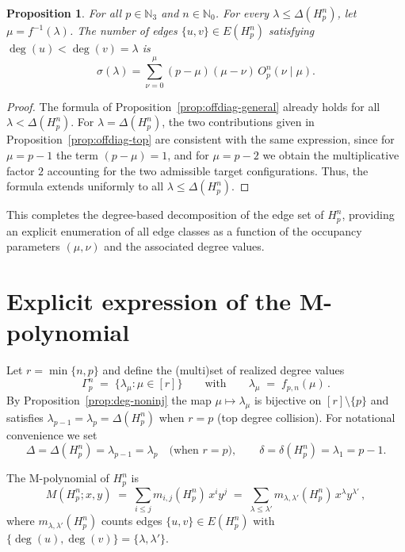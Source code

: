 \documentclass[letterpaper,12pt]{article}
\newtheorem{proposition}{Proposition}
\begin{document}
\begin{proposition}\label{prop:offdiag-lambda}
For all $p \in \mathbb{N}_3$ and $n \in \mathbb{N}_0$. For every $\lambda\le\Delta(H_p^n)$, let $\mu=f^{-1}(\lambda)$.  
The number of edges $\{u,v\}\in E(H_p^n)$ satisfying $\deg(u)<\deg(v)=\lambda$ is
\begin{equation}
    \sigma(\lambda)
    = \sum_{\nu = 0}^{\mu} (p-\mu)(\mu-\nu)\,O_p^n(\nu \mid \mu).
\end{equation}
\end{proposition}

\begin{proof}
The formula of Proposition~\ref{prop:offdiag-general} already holds for all $\lambda<\Delta(H_p^n)$.  
For $\lambda=\Delta(H_p^n)$, the two contributions given in Proposition~\ref{prop:offdiag-top} are consistent with the same expression, since for $\mu=p-1$ the term $(p-\mu)=1$, and for $\mu=p-2$ we obtain the multiplicative factor $2$ accounting for the two admissible target configurations.  
Thus, the formula extends uniformly to all $\lambda\le\Delta(H_p^n)$.
\end{proof}


\noindent
This completes the degree-based decomposition of the edge set of $H_p^n$, providing an explicit enumeration of all edge classes as a function of the occupancy parameters $(\mu,\nu)$ and the associated degree values.  




\section{Explicit expression of the M-polynomial }
\label{sec:explicit}

Let $r=\min\{n,p\}$ and define the (multi)set of realized degree values
\[
\Gamma_p^n \;=\; \Big\{ \lambda_\mu : \mu\in[r] \Big\}
\qquad\text{with}\qquad
\lambda_\mu \;=\; f_{p,n}(\mu)\,.
\]
By Proposition~\ref{prop:deg-noninj} the map $\mu\mapsto\lambda_\mu$ is bijective on $[r]\setminus\{p\}$
and satisfies $\lambda_{p-1}=\lambda_p=\Delta(H_p^n)$ when $r=p$ (top degree collision).
For notational convenience we set
\[
\Delta = \Delta(H_p^n)=\lambda_{p-1}=\lambda_p
\quad\text{(when $r=p$)},\qquad
\delta = \delta(H_p^n)=\lambda_1=p-1.
\]

The M-polynomial of $H_p^n$ is
\[
M(H_p^n;x,y)
\;=\;
\sum_{i\le j} m_{i,j}(H_p^n)\,x^i y^j
\;=\;
\sum_{\lambda\le \lambda'} m_{\lambda,\lambda'}(H_p^n)\,x^\lambda y^{\lambda'}\,,
\]
where $m_{\lambda,\lambda'}(H_p^n)$ counts edges $\{u,v\}\in E(H_p^n)$ with
$\{\deg(u),\deg(v)\}=\{\lambda,\lambda'\}$.
\end{document}
